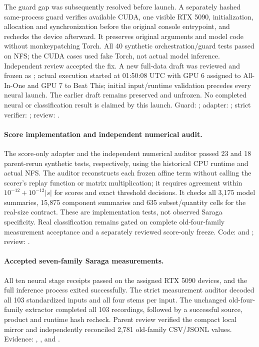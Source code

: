 The guard gap was subsequently resolved before launch. A separately hashed
same-process guard verifies available CUDA, one visible RTX 5090, initialization,
allocation and synchronization before the original console entrypoint, and
rechecks the device afterward. It preserves original arguments and model code
without monkeypatching Torch. All 40 synthetic orchestration/guard tests passed
on NFS; the CUDA cases used fake Torch, not actual model inference. Independent
review accepted the fix. A new full-data draft was reviewed and frozen as
; actual execution
started at 01:50:08 UTC with GPU 6 assigned to All-In-One and GPU 7 to Beat This;
initial input/runtime validation precedes every neural launch. The earlier draft remains preserved and
unfrozen. No completed neural or classification result is claimed by this launch.
Guard: ; adapter:
; strict verifier:
; review:
.

\paragraph{Score implementation and independent numerical audit.}
The score-only adapter and the independent numerical auditor passed 23 and
18 parent-rerun synthetic tests, respectively, using the historical CPU
runtime and actual NFS. The auditor reconstructs each frozen affine term
without calling the scorer's replay function or matrix multiplication; it
requires agreement within $10^{-12}+10^{-12}|s|$ for scores and exact threshold
decisions. It checks all 3,175 model summaries, 15,875 component summaries and
635 subset/quantity cells for the real-size contract. These are implementation
tests, not observed Saraga specificity. Real classification remains gated on
complete old-four-family measurement acceptance and a separately reviewed
score-only freeze. Code:  and
; review:
.

\paragraph{Accepted seven-family Saraga measurements.}
All ten neural stage receipts passed on the assigned RTX 5090 devices, and
the full inference process exited successfully. The strict measurement auditor
decoded all 103 standardized inputs and all four stems per input. The unchanged
old-four-family extractor completed all 103 recordings, followed by a successful
source, product and runtime hash recheck. Parent review verified the compact
local mirror and independently reconciled 2,781 old-family CSV/JSONL values.
Evidence: ,
, and
.

